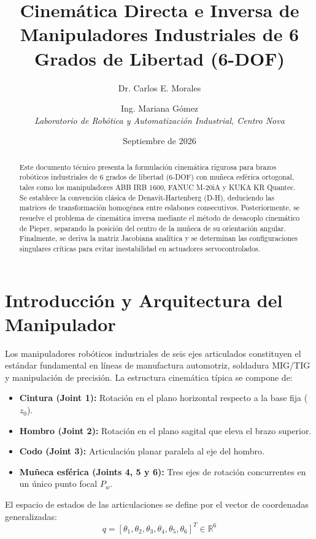 \documentclass[11pt,a4paper]{article}
\title{Cinemática Directa e Inversa de Manipuladores Industriales de 6 Grados de Libertad (6-DOF)}
\author{Dr. Carlos E. Morales \and Ing. Mariana Gómez \\ 
\textit{Laboratorio de Robótica y Automatización Industrial, Centro Nova}}
\date{Septiembre de 2026}
\begin{document}
\maketitle

\begin{abstract}
Este documento técnico presenta la formulación cinemática rigurosa para brazos robóticos industriales de 6 grados de libertad (6-DOF) con muñeca esférica ortogonal, tales como los manipuladores ABB IRB 1600, FANUC M-20iA y KUKA KR Quantec. Se establece la convención clásica de Denavit-Hartenberg (D-H), deduciendo las matrices de transformación homogénea entre eslabones consecutivos. Posteriormente, se resuelve el problema de cinemática inversa mediante el método de desacoplo cinemático de Pieper, separando la posición del centro de la muñeca de su orientación angular. Finalmente, se deriva la matriz Jacobiana analítica y se determinan las configuraciones singulares críticas para evitar inestabilidad en actuadores servocontrolados.
\end{abstract}

\section{Introducción y Arquitectura del Manipulador}
Los manipuladores robóticos industriales de seis ejes articulados constituyen el estándar fundamental en líneas de manufactura automotriz, soldadura MIG/TIG y manipulación de precisión. La estructura cinemática típica se compone de:
\begin{itemize}
    \item \textbf{Cintura (Joint 1):} Rotación en el plano horizontal respecto a la base fija ($z_0$).
    \item \textbf{Hombro (Joint 2):} Rotación en el plano sagital que eleva el brazo superior.
    \item \textbf{Codo (Joint 3):} Articulación planar paralela al eje del hombro.
    \item \textbf{Muñeca esférica (Joints 4, 5 y 6):} Tres ejes de rotación concurrentes en un único punto focal $P_w$.
\end{itemize}

El espacio de estados de las articulaciones se define por el vector de coordenadas generalizadas:
\begin{equation}
q = [\theta_1, \theta_2, \theta_3, \theta_4, \theta_5, \theta_6]^T \in \mathbb{R}^6
\end{equation}
\end{document}
